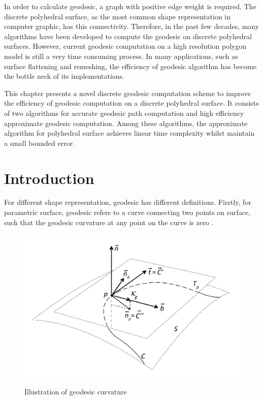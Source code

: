 In order to calculate geodesic, a graph with positive edge weight is required. The discrete polyhedral surface, as the most common shape representation in computer graphic, has this connectivity. Therefore, in the past few decades, many algorithms have been developed to compute the geodesic on discrete polyhedral surfaces. However, current geodesic computation on a high resolution polygon model is still a very time consuming process. In many applications, such as surface flattening\citep{Zigelman998671} and remeshing, the efficiency of geodesic algorithm has become the bottle neck of its implementations. 

This chapter presents a novel discrete geodesic computation scheme to improve the efficiency of geodesic computation on a discrete polyhedral surface. It consists of two algorithms for accurate geodesic path computation and high efficiency approximate geodesic computation. Among these algorithms, the approximate algorithm for polyhedral surface achieves linear time complexity whilst maintain a small bounded error. 

\section{Introduction}

For different shape representation, geodesic has different definitions. Firstly, for parametric surface, geodesic refers to a curve connecting two points on surface, such that the geodesic curvature at any point on the curve is zero . 

\begin{figure}[H]
	\includegraphics[width=\columnwidth]{../images/geodesic_smoothSurfDef}\\[0.1cm]
    \caption{Illustration of geodesic curvature}
    \label{figure:geo_smoothDef}
\end{figure}

